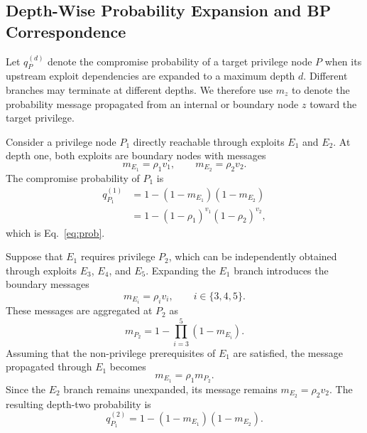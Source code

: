 \documentclass[conference]{IEEEtran}
\theoremstyle{definition} %
\theoremstyle{plain} %
\begin{document}
\subsection{Depth-Wise Probability Expansion and BP Correspondence}
\label{app:bp_proof}

Let $q_P^{(d)}$ denote the compromise probability of a target privilege node $P$ when its upstream exploit dependencies are expanded to a maximum depth $d$. Different branches may terminate at different depths. We therefore use $m_z$ to denote the probability message propagated from an internal or boundary node $z$ toward the target privilege.

Consider a privilege node $P_1$ directly reachable through exploits $E_1$ and $E_2$. At depth one, both exploits are boundary nodes with messages
\begin{equation}
m_{E_1}=\rho_1v_1,
\qquad
m_{E_2}=\rho_2v_2.
\end{equation}
The compromise probability of $P_1$ is
\begin{equation}
\begin{aligned}
q_{P_1}^{(1)}
&=1-(1-m_{E_1})(1-m_{E_2})\\
&=1-(1-\rho_1)^{v_1}(1-\rho_2)^{v_2},
\end{aligned}
\label{eq:depth_one_example}
\end{equation}
which is Eq.~\eqref{eq:prob}.

Suppose that $E_1$ requires privilege $P_2$, which can be independently obtained through exploits $E_3$, $E_4$, and $E_5$. Expanding the $E_1$ branch introduces the boundary messages
\begin{equation}
m_{E_i}=\rho_iv_i,
\qquad i\in\{3,4,5\}.
\end{equation}
These messages are aggregated at $P_2$ as
\begin{equation}
m_{P_2}
=
1-\prod_{i=3}^{5}(1-m_{E_i}).
\label{eq:p2_message}
\end{equation}
Assuming that the non-privilege prerequisites of $E_1$ are satisfied, the message propagated through $E_1$ becomes
\begin{equation}
m_{E_1}
=
\rho_1m_{P_2}.
\label{eq:e1_message}
\end{equation}
Since the $E_2$ branch remains unexpanded, its message remains $m_{E_2}=\rho_2v_2$. The resulting depth-two probability is
\begin{equation}
q_{P_1}^{(2)}
=
1-(1-m_{E_1})(1-m_{E_2}).
\label{eq:depth_two_example}
\end{equation}
\end{document}
